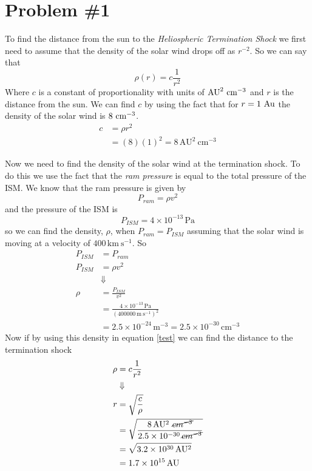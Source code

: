 \documentclass[11pt]{article}
\numberwithin{equation}{section}
\newcommand{\unit}[1]{\ensuremath{\, \mathrm{#1}}}
\begin{document}


\section{Problem \#1}
To find the distance from the sun to the \emph{Heliospheric Termination Shock} we first need to assume that the density of the solar wind drops off as $r^{-2}$. So we can say that
\begin{equation}
\rho(r) = c\frac{1}{r^2}
\label{test}
\end{equation}
Where $c$ is a constant of proportionality with units of $\textnormal{AU}^2\ \textnormal{cm}^{-3}$ and $r$ is the distance from the sun. We can find $c$ by using the fact that for $r=1\ \textnormal{Au}$ the density of the solar wind is $8\ \textnormal{cm}^{-3}$.
\begin{align*}
c &= \rho r^2\\
&= (8)(1)^2 = 8\unit{AU^2\ cm^{-3}} 
\end{align*}

Now we need to find the density of the solar wind at the termination shock. To do this we use the fact that the \emph{ram pressure} is equal to the total pressure of the ISM. We know that the ram pressure is given by
$$P_{ram} = \rho v^2$$
and the pressure of the ISM is
$$P_{ISM} = 4\times10^{-13}\unit{Pa}$$
so we can find the density, $\rho$, when $P_{ram}=P_{ISM}$ assuming that the solar wind is moving at a velocity of $400\unit{km\ s^{-1}}$. So
\begin{align*}
P_{ISM} &= P_{ram}\\
P_{ISM} &= \rho v^2\\
&\Downarrow\\
\rho &= \frac{P_{ISM}}{v^2}\\
&= \frac{4\times10^{-13}\unit{Pa}}{(400000\unit{m\ s^{-1}})^2}\\
&= 2.5\times10^{-24}\unit{m^{-3}} = 2.5\times10^{-30}\unit{cm^{-3}} 
\end{align*}
Now if by using this density in equation \ref{test} we can find the distance to the termination shock
\begin{align*}
\rho &= c\frac{1}{r^2}\\
&\Downarrow\\
r &= \sqrt{\frac{c}{\rho}}\\
&= \sqrt{\frac{8\unit{AU^2\ \cancel{cm^{-3}}}}{2.5\times10^{-30}\unit{\cancel{cm^{-3}}}}}\\
&= \sqrt{3.2\times10^{30}\unit{AU^2}}\\
&= 1.7\times10^{15}\unit{AU}
\end{align*}
\end{document}
